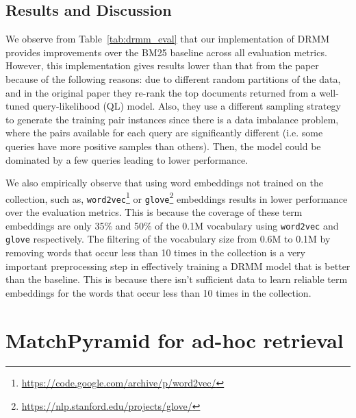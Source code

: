 \subsection{Results and Discussion}
We observe from Table~\ref{tab:drmm_eval} that our implementation of DRMM provides improvements over the BM25 baseline across all evaluation metrics. However, this implementation gives results lower than that from the paper because of the following reasons: due to different random partitions of the data, and in the original paper they re-rank the top documents returned from a well-tuned query-likelihood (QL) model. Also, they use a different sampling strategy to generate the training pair instances since there is a data imbalance problem, where the pairs available for each query are significantly different (i.e. some queries have more positive samples than others). Then, the model could be dominated by a few queries leading to lower performance. 

We also empirically observe that using word embeddings not trained on the collection, such as, \texttt{word2vec}\footnote{\url{https://code.google.com/archive/p/word2vec/}} or \texttt{glove}\footnote{\url{https://nlp.stanford.edu/projects/glove/}} embeddings results in lower performance over the evaluation metrics. This is because the coverage of these term embeddings are only 35\% and 50\% of the 0.1M vocabulary using \texttt{word2vec} and \texttt{glove} respectively. The filtering of the vocabulary size from 0.6M to 0.1M by removing words that occur less than 10 times in the collection is a very important preprocessing step in effectively training a DRMM model that is better than the baseline. This is because there isn't sufficient data to learn reliable term embeddings for the words that occur less than 10 times in the collection. 

\section{MatchPyramid for ad-hoc retrieval}

